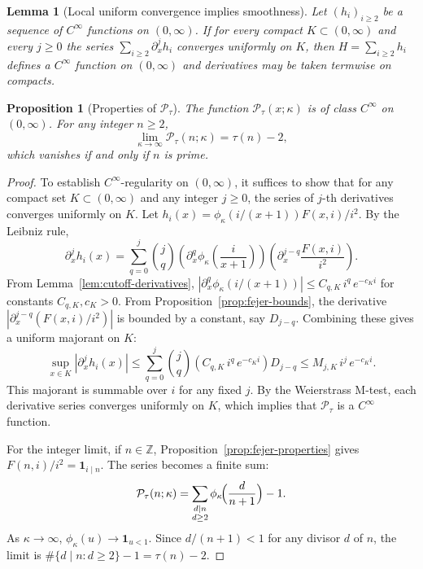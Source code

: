 \documentclass[11pt,a4paper]{amsart}
\theoremstyle{plain}
\newtheorem{lemma}[theorem]{Lemma}
\newtheorem{proposition}[theorem]{Proposition}
\theoremstyle{definition}
\theoremstyle{remark}
\begin{document}
\begin{lemma}[Local uniform convergence implies smoothness]\label{lem:local_uniform_smooth}
Let $(h_i)_{i\ge2}$ be a sequence of $C^\infty$ functions on $(0,\infty)$. If for every compact $K\subset(0,\infty)$ and every $j\ge0$ the series $\sum_{i\ge2}\partial_x^j h_i$ converges uniformly on $K$, then $H=\sum_{i\ge2} h_i$ defines a $C^\infty$ function on $(0,\infty)$ and derivatives may be taken termwise on compacts.
\end{lemma}

\begin{proposition}[Properties of $\mathcal{P}_{\tau}$]
The function $\mathcal{P}_{\tau}(x;\kappa)$ is of class $C^\infty$ on $(0,\infty)$. For any integer $n\ge2$,
\[
\lim_{\kappa\to\infty} \mathcal{P}_{\tau}(n; \kappa) = \tau(n)-2,
\]
which vanishes if and only if $n$ is prime.
\end{proposition}
\begin{proof}
To establish $C^\infty$-regularity on $(0,\infty)$, it suffices to show that for any compact set $K\subset(0,\infty)$ and any integer $j\ge0$, the series of $j$-th derivatives converges uniformly on $K$. Let $h_i(x) = \phi_{\kappa}(i/(x+1)) F(x,i)/i^2$. By the Leibniz rule,
\[
\partial_x^j h_i(x) = \sum_{q=0}^j \binom{j}{q} \left( \partial_x^q \phi_{\kappa}\!\left(\frac{i}{x+1}\right) \right) \left( \partial_x^{j-q} \frac{F(x,i)}{i^2} \right).
\]
From Lemma~\ref{lem:cutoff-derivatives}, $|\partial_x^q \phi_{\kappa}(i/(x+1))| \le C_{q,K} \, i^q \, e^{-c_K i}$ for constants $C_{q,K}, c_K > 0$. From Proposition~\ref{prop:fejer-bounds}, the derivative $|\partial_x^{j-q} (F(x,i)/i^2)|$ is bounded by a constant, say $D_{j-q}$. Combining these gives a uniform majorant on $K$:
\[
\sup_{x\in K} |\partial_x^j h_i(x)| \le \sum_{q=0}^j \binom{j}{q} (C_{q,K} \, i^q \, e^{-c_K i}) D_{j-q} \le M_{j,K} \, i^{j} \, e^{-c_K i}.
\]
This majorant is summable over $i$ for any fixed $j$. By the Weierstrass M-test, each derivative series converges uniformly on $K$, which implies that $\mathcal{P}_{\tau}$ is a $C^\infty$ function.

For the integer limit, if $n\in\mathbb Z$, Proposition~\ref{prop:fejer-properties} gives $F(n,i)/i^2 = \mathbf{1}_{i\mid n}$. The series becomes a finite sum:
\[
\mathcal{P}_{\tau}(n;\kappa)=\sum_{\substack{d\mid n\\ d\ge2}} \phi_{\kappa}\!\Bigl(\frac{d}{n+1}\Bigr)-1.
\]
As $\kappa\to\infty$, $\phi_{\kappa}(u)\to\mathbf 1_{u<1}$. Since $d/(n+1)<1$ for any divisor $d$ of $n$, the limit is $\#\{d\mid n: d\ge2\}-1 = \tau(n)-2$.
\end{proof}
\end{document}
